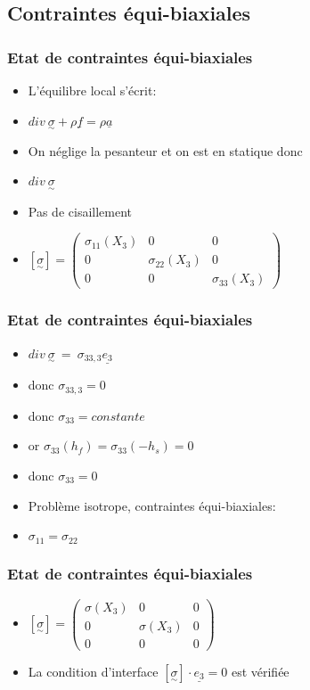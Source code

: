 \subsection{Contraintes équi-biaxiales} 
\begin{frame}
    \frametitle{Etat de contraintes équi-biaxiales} 
    \begin{itemize}
        \item L'équilibre local s'écrit:
        \item $div ~\underset{\sim}{\sigma} +\rho \underline{f} = \rho \underline{a}$
        \item On néglige la pesanteur et on est en statique donc
        \item $div~\underset{\sim}{\sigma}$
        \item Pas de cisaillement
        \item $[\underset{\sim}{\sigma}]=\begin{pmatrix}\sigma_{11}(X_3)&0&0\\0&\sigma_{22}(X_3)&0\\0&0&\sigma_{33}(X_3)\end{pmatrix}$ 
    \end{itemize}
\end{frame}   

\begin{frame}
    \frametitle{Etat de contraintes équi-biaxiales} 
    \begin{itemize}
        \item $div~\underset{\sim}{\sigma}~=~\sigma_{33,3}\underline{e_3}$
        \item donc $\sigma_{33,3}=0$
        \item donc $\sigma_{33}=constante$
        \item or $\sigma_{33}(h_f) = \sigma_{33}(-h_s) = 0$
        \item donc $\sigma_{33}=0$
        \item Problème isotrope, contraintes équi-biaxiales:
        \item $\sigma_{11}=\sigma_{22} $
    \end{itemize}
\end{frame}   
\begin{frame}
    \frametitle{Etat de contraintes équi-biaxiales} 
    \begin{itemize}
        \item $[\underset{\sim}{\sigma}]=\begin{pmatrix}\sigma(X_3)&0&0\\0&\sigma(X_3)&0\\0&0&0\end{pmatrix}$ 
        \item La condition d'interface $[\underset{\sim}{\sigma}]\cdot\underline{e_3} = 0 $ est vérifiée
    \end{itemize}
\end{frame}   


